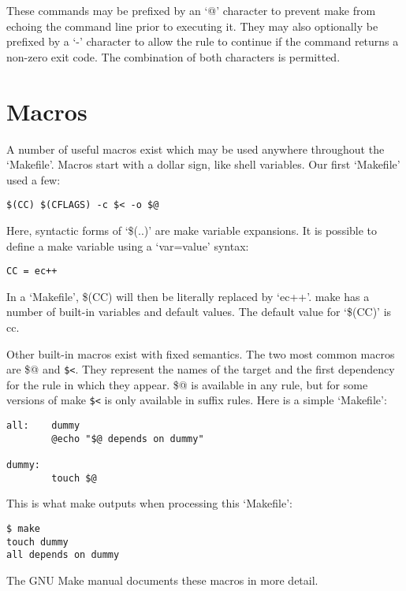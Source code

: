 These commands may be prefixed by an `@' character to prevent make from echoing the command line prior to executing it. They may also optionally be prefixed by a `-' character to allow the rule to continue if the command returns a non-zero exit code. The combination of both characters is permitted.  

\section{Macros}


A number of useful macros exist which may be used anywhere throughout the `Makefile'. Macros start with a dollar sign, like shell variables. Our first `Makefile' used a few: 

\begin{Verbatim}[frame=single]
$(CC) $(CFLAGS) -c $< -o $@
\end{Verbatim}

Here, syntactic forms of `\$(..)' are make variable expansions. It is possible to define a make variable using a `var=value' syntax: 

\begin{Verbatim}[frame=single]
CC = ec++
\end{Verbatim}


In a `Makefile', \$(CC) will then be literally replaced by `ec++'. make has a 
number of built-in variables and default values. The default value 
for `\$(CC)' is cc. 


Other built-in macros exist with fixed semantics. The two most common macros are \$@ and \verb+$<+. They represent the names of the target and the first 
dependency for the rule in which they appear. \$@ is available in any rule,
but for some versions of make \verb+$<+ is only available in suffix rules. Here is a simple `Makefile': 

\begin{Verbatim}[frame=single]
all:    dummy
        @echo "$@ depends on dummy"

dummy:
        touch $@
\end{Verbatim}

This is what make outputs when processing this `Makefile': 


\begin{Verbatim}[frame=single]
$ make
touch dummy
all depends on dummy
\end{Verbatim}

The GNU Make manual documents these macros in more detail. 

